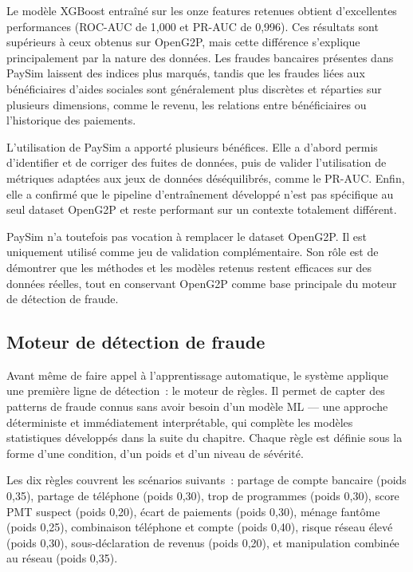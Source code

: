 \documentclass[a4paper, oneside, 12pt]{book}
\begin{document}
\hspace{0.5cm}Le modèle XGBoost entraîné sur les onze features retenues obtient d'excellentes performances (ROC-AUC de 1,000 et PR-AUC de 0,996). Ces résultats sont supérieurs à ceux obtenus sur OpenG2P, mais cette différence s'explique principalement par la nature des données. Les fraudes bancaires présentes dans PaySim laissent des indices plus marqués, tandis que les fraudes liées aux bénéficiaires d'aides sociales sont généralement plus discrètes et réparties sur plusieurs dimensions, comme le revenu, les relations entre bénéficiaires ou l'historique des paiements.

\hspace{0.5cm}L'utilisation de PaySim a apporté plusieurs bénéfices. Elle a d'abord permis d'identifier et de corriger des fuites de données, puis de valider l'utilisation de métriques adaptées aux jeux de données déséquilibrés, comme le PR-AUC. Enfin, elle a confirmé que le pipeline d'entraînement développé n'est pas spécifique au seul dataset OpenG2P et reste performant sur un contexte totalement différent.

\hspace{0.5cm}PaySim n'a toutefois pas vocation à remplacer le dataset OpenG2P. Il est uniquement utilisé comme jeu de validation complémentaire. Son rôle est de démontrer que les méthodes et les modèles retenus restent efficaces sur des données réelles, tout en conservant OpenG2P comme base principale du moteur de détection de fraude.
\subsection{Moteur de détection de fraude}

\hspace{0.5cm}Avant même de faire appel à l'apprentissage automatique, le système applique une première ligne de détection~: le moteur de règles. Il permet de capter des patterns de fraude connus sans avoir besoin d'un modèle ML — une approche déterministe et immédiatement interprétable, qui complète les modèles statistiques développés dans la suite du chapitre. Chaque règle est définie sous la forme d'une condition, d'un poids et d'un niveau de sévérité.

\hspace{0.5cm}Les dix règles couvrent les scénarios suivants~: partage de compte bancaire (poids 0,35), partage de téléphone (poids 0,30), trop de programmes (poids 0,30), score PMT suspect (poids 0,20), écart de paiements (poids 0,30), ménage fantôme (poids 0,25), combinaison téléphone et compte (poids 0,40), risque réseau élevé (poids 0,30), sous-déclaration de revenus (poids 0,20), et manipulation combinée au réseau (poids 0,35).
\end{document}
